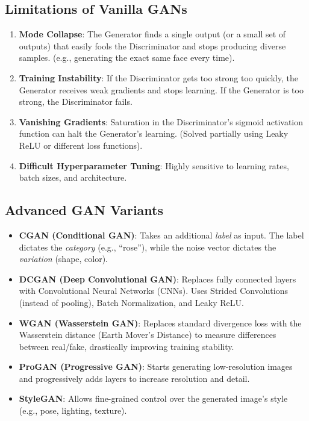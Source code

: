 \documentclass[11pt,a4paper]{article}
\begin{document}
\subsection{Limitations of Vanilla GANs}

\begin{enumerate}
    \item \textbf{Mode Collapse}: The Generator finds a single output (or a small set of outputs) that easily fools the Discriminator and stops producing diverse samples. (e.g., generating the exact same face every time).
    \item \textbf{Training Instability}: If the Discriminator gets too strong too quickly, the Generator receives weak gradients and stops learning. If the Generator is too strong, the Discriminator fails.
    \item \textbf{Vanishing Gradients}: Saturation in the Discriminator's sigmoid activation function can halt the Generator's learning. (Solved partially using Leaky ReLU or different loss functions).
    \item \textbf{Difficult Hyperparameter Tuning}: Highly sensitive to learning rates, batch sizes, and architecture.
\end{enumerate}

\subsection{Advanced GAN Variants}

\begin{itemize}
    \item \textbf{CGAN (Conditional GAN)}: Takes an additional \textit{label} as input. The label dictates the \textit{category} (e.g., ``rose''), while the noise vector dictates the \textit{variation} (shape, color).
    \item \textbf{DCGAN (Deep Convolutional GAN)}: Replaces fully connected layers with Convolutional Neural Networks (CNNs). Uses Strided Convolutions (instead of pooling), Batch Normalization, and Leaky ReLU.
    \item \textbf{WGAN (Wasserstein GAN)}: Replaces standard divergence loss with the Wasserstein distance (Earth Mover's Distance) to measure differences between real/fake, drastically improving training stability.
    \item \textbf{ProGAN (Progressive GAN)}: Starts generating low-resolution images and progressively adds layers to increase resolution and detail.
    \item \textbf{StyleGAN}: Allows fine-grained control over the generated image's style (e.g., pose, lighting, texture).
\end{itemize}
\end{document}
